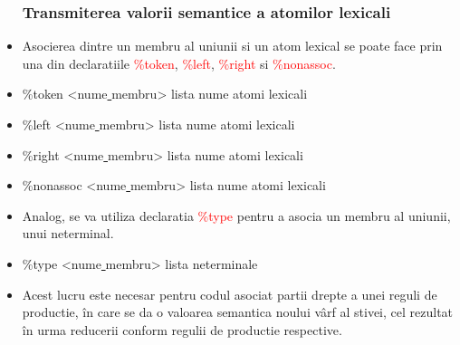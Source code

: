 \documentclass[pdf]{beamer}
\begin{document}
\begin{frame}
\begin{itemize}
\frametitle{Transmiterea valorii semantice a atomilor lexicali}
\item
Asocierea dintre un membru al uniunii si un atom lexical se poate face prin una din declaratiile \textcolor{red}{\%token}, \textcolor{red}{\%left}, \textcolor{red}{\%right} si \textcolor{red}{\%nonassoc}.
\item \vspace{5mm}
\%token <nume\underline{ }membru> lista nume atomi lexicali
\item
\%left <nume\underline{ }membru> lista nume atomi lexicali
\item
\%right <nume\underline{ }membru> lista nume atomi lexicali
\item
\%nonassoc <nume\underline{ }membru> lista nume atomi lexicali

\end{itemize}
\end{frame}



\begin{frame}
\begin{itemize}
\frametitle{Transmiterea valorii semantice a atomilor lexicali}
\item
Analog, se va utiliza declaratia \textcolor{red}{\%type} pentru a asocia un membru al uniunii, unui neterminal.
\item \vspace{5mm}
\%type <nume\underline{ }membru> lista neterminale
\item \vspace{5mm}
Acest lucru este necesar pentru codul asociat partii drepte a unei reguli de productie, în care se da o valoarea semantica noului vârf al stivei, cel rezultat în urma reducerii conform regulii de productie respective.

\end{itemize}
\end{frame}
\end{document}
